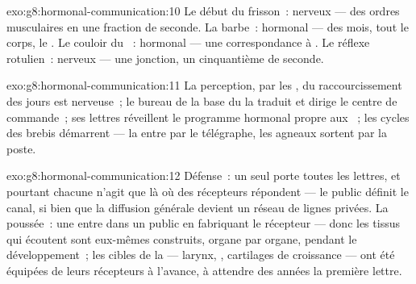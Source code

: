 \begin{solution}{exo:g8:hormonal-communication:10}
Le début du frisson~: nerveux --- des ordres musculaires en
une fraction de seconde. La barbe~: hormonal --- des mois,
tout le corps, le . Le couloir du ~: hormonal ---
une correspondance à . Le réflexe rotulien~:
nerveux --- une jonction, un cinquantième de seconde.
\end{solution}

\begin{solution}{exo:g8:hormonal-communication:11}
La perception, par les , du raccourcissement des jours
est nerveuse~; le bureau de la base du  la traduit et
dirige le centre de commande~; ses lettres réveillent le
programme hormonal propre aux ~; les cycles des
brebis démarrent --- la  entre par le télégraphe, les
agneaux sortent par la poste.
\end{solution}

\begin{solution}{exo:g8:hormonal-communication:12}
Défense~: un seul  porte toutes les lettres, et pourtant
chacune n'agit que là où des récepteurs répondent --- le
public définit le canal, si bien que la diffusion générale
devient un réseau de lignes privées. La poussée~: une
 entre dans un public en fabriquant le récepteur ---
donc les tissus qui écoutent sont eux-mêmes construits,
organe par organe, pendant le développement~; les cibles de
la  --- larynx, , cartilages de croissance ---
ont été équipées de leurs récepteurs à l'avance, à attendre
des années la première lettre.
\end{solution}

